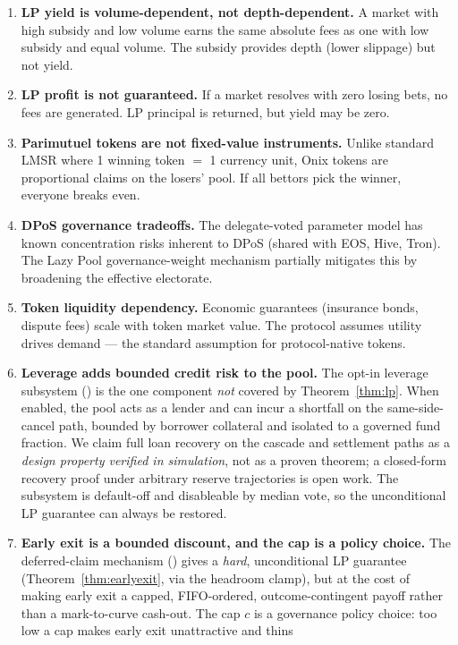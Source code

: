 \documentclass{ledger}
\theoremstyle{plain}
\theoremstyle{remark}
\begin{document}
\begin{enumerate}
  \item \textbf{LP yield is volume-dependent, not depth-dependent.} A market with
  high subsidy and low volume earns the same absolute fees as one with low
  subsidy and equal volume. The subsidy provides depth (lower slippage) but not
  yield.
  \item \textbf{LP profit is not guaranteed.} If a market resolves with zero
  losing bets, no fees are generated. LP principal is returned, but yield may be
  zero.
  \item \textbf{Parimutuel tokens are not fixed-value instruments.} Unlike
  standard LMSR where 1 winning token $=$ 1 currency unit, Onix tokens are
  proportional claims on the losers' pool. If all bettors pick the winner,
  everyone breaks even.
  \item \textbf{DPoS governance tradeoffs.} The delegate-voted parameter model
  has known concentration risks inherent to DPoS (shared with EOS, Hive, Tron).
  The Lazy Pool governance-weight mechanism partially mitigates this by
  broadening the effective electorate.
  \item \textbf{Token liquidity dependency.} Economic guarantees (insurance
  bonds, dispute fees) scale with token market value. The protocol assumes
  utility drives demand --- the standard assumption for protocol-native tokens.
  \item \textbf{Leverage adds bounded credit risk to the pool.} The opt-in
  leverage subsystem () is the one component \emph{not}
  covered by Theorem~\ref{thm:lp}. When enabled, the pool acts as a lender and
  can incur a shortfall on the same-side-cancel path, bounded by borrower
  collateral and isolated to a governed fund fraction. We claim full loan
  recovery on the cascade and settlement paths as a \emph{design property
  verified in simulation}, not as a proven theorem; a closed-form recovery proof
  under arbitrary reserve trajectories is open work. The subsystem is default-off
  and disableable by median vote, so the unconditional LP guarantee can always
  be restored.
  \item \textbf{Early exit is a bounded discount, and the cap is a policy
  choice.} The deferred-claim mechanism () gives a
  \emph{hard}, unconditional LP guarantee (Theorem~\ref{thm:earlyexit}, via the
  headroom clamp), but at the cost of making early exit a capped, FIFO-ordered,
  outcome-contingent payoff rather than a mark-to-curve cash-out. The cap $c$ is a
  governance policy choice: too low a cap makes early exit unattractive and thins

\end{enumerate}
\end{document}
